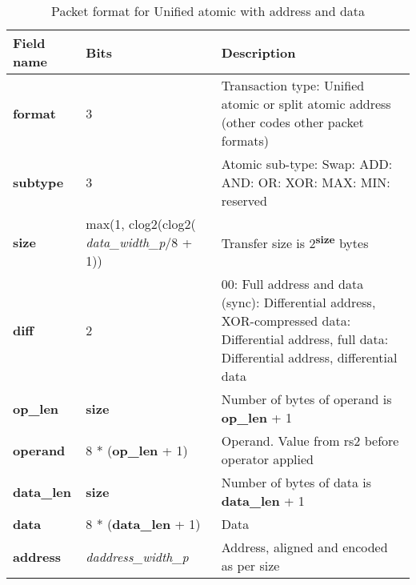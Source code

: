 \begin{table}[htp]
  \centering
  \caption{Packet format for Unified atomic with address and data}
  \label{tab:te_datadx0y5}
  \begin{tabulary}{\textwidth}{|l|p{38mm}|p{92mm}|}
    \hline
    {\bf Field name} & {\bf Bits} & {\bf Description} \\
    \hline
    \textbf{format} & 	3	& Transaction type: Unified atomic or split atomic address\newline	
		(other codes other packet formats)\\
    \hline
    \textbf{subtype} & 	3	& Atomic sub-type: Swap: ADD: AND: OR: XOR: MAX: MIN: reserved\\	

    \hline
    \textbf{size} & max(1, clog2(clog2( \textit{data\_width\_p}/8 + 1)) & Transfer size is 2\textsuperscript{\textbf{size}} bytes\\
    \hline
    \textbf{diff} & 2 & 00: Full address and data (sync): Differential address, XOR-compressed data: Differential address, full data: Differential address, differential data\\
    \hline
    \textbf{op\_len} & \textbf{size} & Number of bytes of operand is \textbf{op\_len} + 1\\
    \hline
    \textbf{operand}	& 8 * (\textbf{op\_len} + 1) & Operand.  Value from rs2 before operator applied\\
    \hline
    \textbf{data\_len}	& \textbf{size} & Number of bytes of data is \textbf{data\_len} + 1\\
    \hline
    \textbf{data} & 8 * (\textbf{data\_len} + 1) & 
                Data\\
    \hline
    \textbf{address} &  \textit{daddress\_width\_p} & Address, aligned and encoded as per size \\
    \hline
  \end{tabulary}
\end{table}

